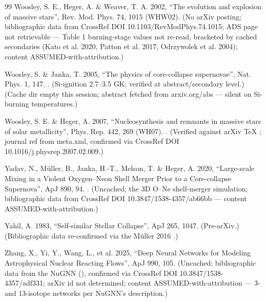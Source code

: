 \begin{thebibliography}{99}
Woosley, S. E., Heger, A. \& Weaver, T. A. 2002, ``The evolution and explosion of massive stars'', Rev. Mod. Phys. 74, 1015 (WHW02). (No arXiv posting; bibliographic data from CrossRef DOI 10.1103/RevModPhys.74.1015; ADS page not retrievable --- Table 1 burning-stage values not re-read, bracketed by cached secondaries (Kato et al. 2020, Patton et al. 2017, Odrzywolek et al. 2004); content ASSUMED-with-attribution.)

Woosley, S. \& Janka, T. 2005, ``The physics of core-collapse supernovae'', Nat. Phys. 1, 147. . (Si-ignition 2.7--3.5 GK; verified at abstract/secondary level.) (Cache dir empty this session; abstract fetched from arxiv.org/abs --- silent on Si-burning temperatures.)

Woosley, S. E. \& Heger, A. 2007, ``Nucleosynthesis and remnants in massive stars of solar metallicity'', Phys. Rep. 442, 269 (WH07). . (Verified against arXiv TeX ; journal ref from meta.xml, confirmed via CrossRef DOI 10.1016/j.physrep.2007.02.009.)

Yadav, N., M\"uller, B., Janka, H.-T., Melson, T. \& Heger, A. 2020, ``Large-scale Mixing in a Violent Oxygen--Neon Shell Merger Prior to a Core-collapse Supernova'', ApJ 890, 94. . (Uncached; the 3D O--Ne shell-merger simulation; bibliographic data from CrossRef DOI 10.3847/1538-4357/ab66bb --- content ASSUMED-with-attribution.)

Yahil, A. 1983, ``Self-similar Stellar Collapse'', ApJ 265, 1047. (Pre-arXiv.) (Bibliographic data re-confirmed via the M\"uller 2016 .)

Zhang, X., Yi, Y., Wang, L., et al. 2025, ``Deep Neural Networks for Modeling Astrophysical Nuclear Reacting Flows'', ApJ 990, 105. (Uncached; bibliographic data from the NuGNN  (), confirmed via CrossRef DOI 10.3847/1538-4357/adf331; arXiv id not determined; content ASSUMED-with-attribution --- 3- and 13-isotope networks per NuGNN's description.)

\end{thebibliography}
\endgroup

